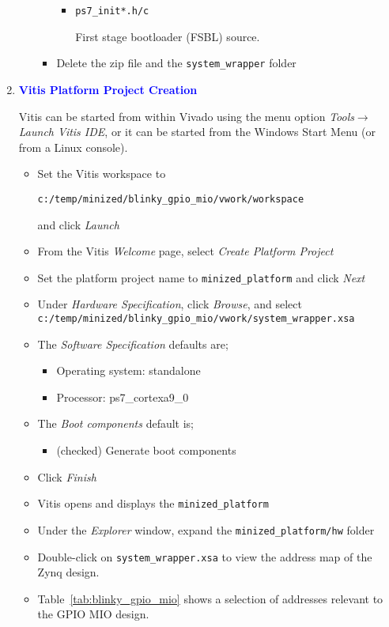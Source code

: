 \begin{enumerate}
\begin{enumerate}
\begin{itemize}
\begin{itemize}
\item \verb+ps7_init*.h/c+

First stage bootloader (FSBL) source.

\end{itemize}
\item Delete the zip file and the \verb+system_wrapper+ folder
\end{itemize}
%
\end{enumerate}
%
\item \textcolor{blue}{\textbf{Vitis Platform Project Creation}}

Vitis can be started from within Vivado using the menu option
\emph{Tools}$\rightarrow$\emph{Launch Vitis IDE}, or it can be
started from the Windows Start Menu (or from a Linux console).

\begin{itemize}
\item Set the Vitis workspace to

\verb+c:/temp/minized/blinky_gpio_mio/vwork/workspace+

and click \emph{Launch}

\item From the Vitis \emph{Welcome} page, select \emph{Create Platform Project}
\item Set the platform project name to \verb+minized_platform+ and click \emph{Next}
\item Under \emph{Hardware Specification}, click \emph{Browse}, and 
select\\
\verb+c:/temp/minized/blinky_gpio_mio/vwork/system_wrapper.xsa+
\item The \emph{Software Specification} defaults are;
\begin{itemize}
\item Operating system: standalone
\item Processor: ps7\_cortexa9\_0
\end{itemize}
\item The \emph{Boot components} default is;
\begin{itemize}
\item (checked) Generate boot components
\end{itemize}
\item Click \emph{Finish}
\item Vitis opens and displays the \verb+minized_platform+
\item Under the \emph{Explorer} window, expand the \verb+minized_platform/hw+ folder
\item Double-click on \verb+system_wrapper.xsa+ to view the address map of the
Zynq design.
\item Table~\ref{tab:blinky_gpio_mio} shows a selection of addresses
relevant to the GPIO MIO design.


\end{itemize}
\end{enumerate}
